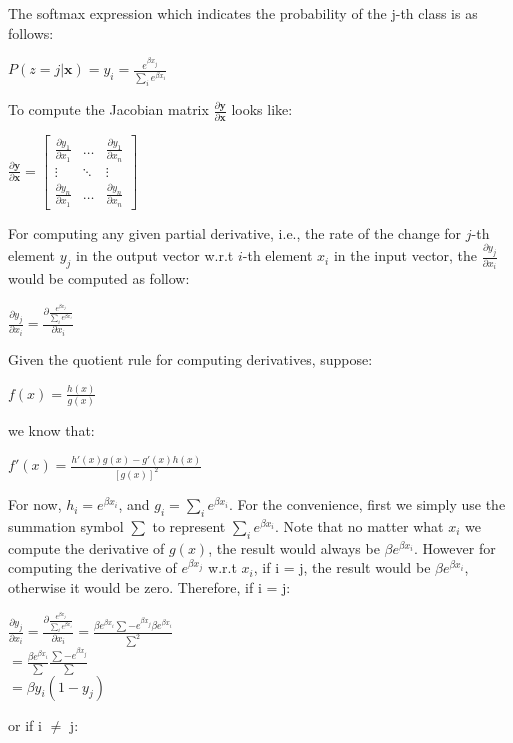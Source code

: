 \documentclass[12pt]{article}
\begin{document}
The softmax expression which indicates the probability of the j-th class is as follows:
\begin{center}
    $P(z=j|\mathbf{x}) = y_{i} = \frac{e^{\beta x_{j}}}{\sum_{i}e^{\beta x_{i}}}$
\end{center}To compute the Jacobian matrix $\frac{\partial \mathbf{y}}{\partial \mathbf{x}}$ looks like:
\begin{center}
    $
    \frac{\partial \mathbf{y}}{\partial \mathbf{x}}=
        \left[\begin{matrix}
        \frac{\partial y_{1}}{\partial x_{1}} & \dots & \frac{\partial y_{1}}{\partial x_{n}} \\
        \vdots & \ddots & \vdots \\
        \frac{\partial y_{n}}{\partial x_{1}} & \dots & \frac{\partial y_{n}}{\partial x_{n}}
        \end{matrix}\right]
    $
\end{center}For computing any given partial derivative, i.e., the rate of the change for $j$-th element $y_{j}$ in the output vector w.r.t $i$-th element $x_{i}$ in the input vector, the $\frac{\partial y_{j}}{\partial x_{i}}$ would be computed as follow:
\begin{center}
    $
    \frac{\partial y_{j}}{\partial x_{i}}=
    \frac{\partial \frac{e^{\beta x_{j}}}{\sum_{i}e^{\beta x_{i}}}}{\partial x_{i}}
    $
\end{center}Given the quotient rule for computing derivatives, suppose:
\begin{center}
    $
    f(x) = \frac{h(x)}{g(x)}
    $
\end{center}we know that:
\begin{center}
    $
    f'(x) = \frac{h'(x)g(x)-g'(x)h(x)}{[g(x)]^2}
    $
\end{center}For now, $h_i = e^{\beta x_{i}}$, and $g_i = \sum_{i}e^{\beta x_{i}}$. For the convenience, first we simply use the summation symbol $\sum$ to represent $\sum_{i}e^{\beta x_{i}}$. Note that no matter what $x_{i}$ we compute the derivative of $g(x)$, the result would always be $\beta e^{\beta x_{i}}$. However for computing the derivative of $e^{\beta x_{j}}$ w.r.t $x_{i}$, if i = j, the result would be $\beta e^{\beta x_{i}}$, otherwise it would be zero.
\newline\indent Therefore, if i = j:
\begin{center}
    $
    \frac{\partial y_{j}}{\partial x_{i}}=
    \frac{\partial \frac{e^{\beta x_{j}}}{\sum_{i}e^{\beta x_{i}}}}{\partial x_{i}}=
    \frac{\beta e^{\beta x_{i}}\sum - e^{\beta x_{j}}\beta e^{\beta x_{i}}}{\sum^2}
    $\\
    $
    =\frac{\beta e^{\beta x_{i}}}{\sum}\frac{\sum - e^{\beta x_{j}}}{\sum}
    $\\
    $
    = \beta y_{i}(1-y_{j})
    $
\end{center}or if i $\neq$ j:
\end{document}
